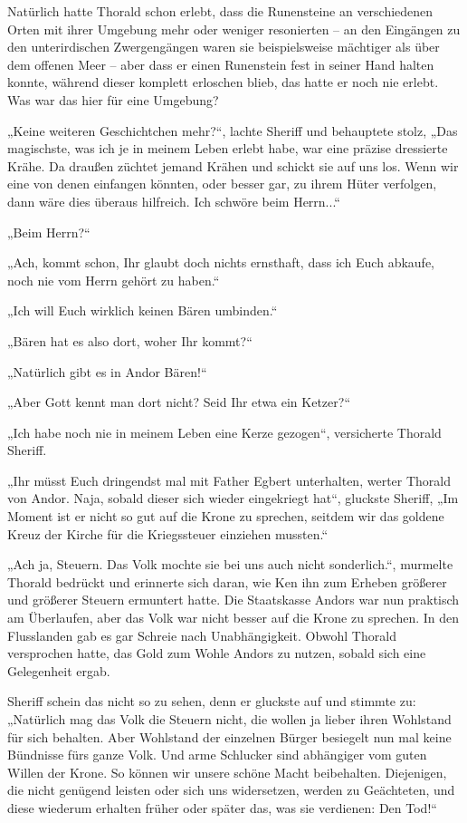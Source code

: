 Natürlich hatte Thorald schon erlebt, dass die Runensteine an verschiedenen Orten mit ihrer Umgebung mehr oder weniger resonierten – an den Eingängen zu den unterirdischen Zwergengängen waren sie beispielsweise mächtiger als über dem offenen Meer – aber dass er einen Runenstein fest in seiner Hand halten konnte, während dieser komplett erloschen blieb, das hatte er noch nie erlebt. Was war das hier für eine Umgebung?

„Keine weiteren Geschichtchen mehr?“, lachte Sheriff und behauptete stolz, „Das magischste, was ich je in meinem Leben erlebt habe, war eine präzise dressierte Krähe. Da draußen züchtet jemand Krähen und schickt sie auf uns los. Wenn wir eine von denen einfangen könnten, oder besser gar, zu ihrem Hüter verfolgen, dann wäre dies überaus hilfreich. Ich schwöre beim Herrn...“

„Beim Herrn?“

„Ach, kommt schon, Ihr glaubt doch nichts ernsthaft, dass ich Euch abkaufe, noch nie vom Herrn gehört zu haben.“

„Ich will Euch wirklich keinen Bären umbinden.“

„Bären hat es also dort, woher Ihr kommt?“

„Natürlich gibt es in Andor Bären!“

„Aber Gott kennt man dort nicht? Seid Ihr etwa ein Ketzer?“

„Ich habe noch nie in meinem Leben eine Kerze gezogen“, versicherte Thorald Sheriff.

„Ihr müsst Euch dringendst mal mit Father Egbert unterhalten, werter Thorald von Andor. Naja, sobald dieser sich wieder eingekriegt hat“, gluckste Sheriff, „Im Moment ist er nicht so gut auf die Krone zu sprechen, seitdem wir das goldene Kreuz der Kirche für die Kriegssteuer einziehen mussten.“

„Ach ja, Steuern. Das Volk mochte sie bei uns auch nicht sonderlich.“, murmelte Thorald bedrückt und erinnerte sich daran, wie Ken ihn zum Erheben größerer und größerer Steuern ermuntert hatte. Die Staatskasse Andors war nun praktisch am Überlaufen, aber das Volk war nicht besser auf die Krone zu sprechen. In den Flusslanden gab es gar Schreie nach Unabhängigkeit. Obwohl Thorald versprochen hatte, das Gold zum Wohle Andors zu nutzen, sobald sich eine Gelegenheit ergab.

Sheriff schein das nicht so zu sehen, denn er gluckste auf und stimmte zu: „Natürlich mag das Volk die Steuern nicht, die wollen ja lieber ihren Wohlstand für sich behalten. Aber Wohlstand der einzelnen Bürger besiegelt nun mal keine Bündnisse fürs ganze Volk. Und arme Schlucker sind abhängiger vom guten Willen der Krone. So können wir unsere schöne Macht beibehalten. Diejenigen, die nicht genügend leisten oder sich uns widersetzen, werden zu Geächteten, und diese wiederum erhalten früher oder später das, was sie verdienen: Den Tod!“

